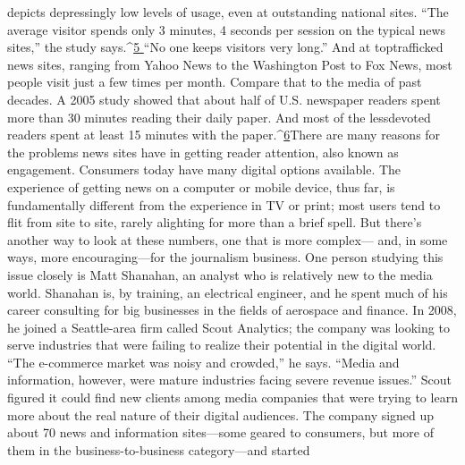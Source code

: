 depicts depressingly low levels of usage, even at outstanding national sites.
``The average visitor spends only 3 minutes, 4 seconds per session on the typical
news sites,'' the study says.^{\href{#endnotes-ch2}{5 }}``No one keeps visitors very long.'' And at toptrafficked
news sites, ranging from Yahoo News to the Washington Post to Fox
News, most people visit just a few times per month. Compare that to the media
of past decades. A 2005 study showed that about half of U.S. newspaper readers
spent more than 30 minutes reading their daily paper. And most of the lessdevoted
readers spent at least 15 minutes with the paper.^{\href{#endnotes-ch2}{6}}There are many reasons for the problems news sites have in getting reader attention,
also known as engagement. Consumers today have many digital options
available. The experience of getting news on a computer or mobile device, thus
far, is fundamentally different from the experience in TV or print; most users
tend to flit from site to site, rarely alighting for more than a brief spell.
But there’s another way to look at these numbers, one that is more complex—
and, in some ways, more encouraging—for the journalism business.
One person studying this issue closely is Matt Shanahan, an analyst who is
relatively new to the media world. Shanahan is, by training, an electrical engineer,
and he spent much of his career consulting for big businesses in the fields of
aerospace and finance. In 2008, he joined a Seattle-area firm called Scout Analytics;
the company was looking to serve industries that were failing to realize their
potential in the digital world. ``The e-commerce market was noisy and crowded,''
he says. ``Media and information, however, were mature industries facing severe
revenue issues.'' Scout figured it could find new clients among media companies
that were trying to learn more about the real nature of their digital audiences.
The company signed up about 70 news and information sites—some geared to
consumers, but more of them in the business-to-business category—and started

